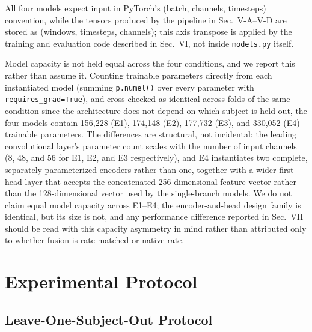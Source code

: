 \documentclass[conference]{IEEEtran}
\begin{document}
All four models expect input in PyTorch's (batch, channels,
timesteps) convention, while the tensors produced by the pipeline in
Sec.~V-A--V-D are stored as (windows, timesteps, channels); this
axis transpose is applied by the training and evaluation code
described in Sec.~VI, not inside \texttt{models.py} itself.

Model capacity is not held equal across the four conditions, and we
report this rather than assume it. Counting trainable parameters
directly from each instantiated model (summing
\texttt{p.numel()} over every parameter with
\texttt{requires\_grad=True}), and cross-checked as identical across
folds of the same condition since the architecture does not depend
on which subject is held out, the four models contain 156{,}228
(E1), 174{,}148 (E2), 177{,}732 (E3), and 330{,}052 (E4) trainable
parameters. The differences are structural, not incidental: the
leading convolutional layer's parameter count scales with the
number of input channels (8, 48, and 56 for E1, E2, and E3
respectively), and E4 instantiates two complete, separately
parameterized encoders rather than one, together with a wider first
head layer that accepts the concatenated 256-dimensional feature
vector rather than the 128-dimensional vector used by the
single-branch models. We do not claim equal model capacity across
E1--E4; the encoder-and-head design family is identical, but its
size is not, and any performance difference reported in Sec.~VII
should be read with this capacity asymmetry in mind rather than
attributed only to whether fusion is rate-matched or native-rate.

\section{Experimental Protocol}
\label{sec:protocol}

\subsection{Leave-One-Subject-Out Protocol}
\label{subsec:loso}
\end{document}
